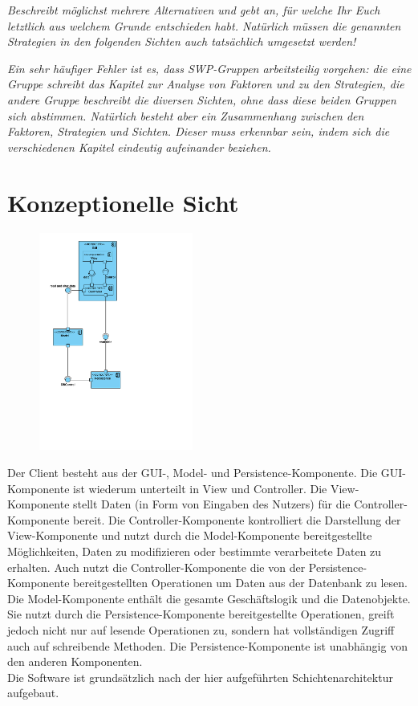 \documentclass[fontsize=12pt,paper=a4,twoside]{scrartcl}
\begin{document}
\textit{Beschreibt möglichst mehrere Alternativen und gebt
  an, für welche Ihr Euch letztlich aus welchem Grunde entschieden
  habt. Natürlich müssen die genannten Strategien in den folgenden
  Sichten auch tatsächlich umgesetzt werden!}

\textit{Ein sehr häufiger Fehler ist es, dass SWP-Gruppen
  arbeitsteilig vorgehen: die eine Gruppe schreibt das Kapitel zur
  Analyse von Faktoren und zu den Strategien, die andere Gruppe
  beschreibt die diversen Sichten, ohne dass diese beiden Gruppen sich
  abstimmen. Natürlich besteht aber ein Zusammenhang zwischen den
  Faktoren, Strategien und Sichten. Dieser muss erkennbar sein, indem
  sich die verschiedenen Kapitel eindeutig aufeinander beziehen.}

\section{Konzeptionelle Sicht}
\label{sec:konzeptionell}

\begin{figure}[H]
\centering
\includegraphics[width=0.45\textwidth]{konzeptsicht.pdf}
\end{figure}


Der Client besteht aus der GUI-, Model- und Persistence-Komponente. Die GUI-Komponente ist wiederum unterteilt in View und Controller. Die View-Komponente stellt Daten (in Form von Eingaben des Nutzers) für die Controller-Komponente bereit. Die Controller-Komponente kontrolliert die Darstellung der View-Komponente und nutzt durch die Model-Komponente bereitgestellte Möglichkeiten, Daten zu modifizieren oder bestimmte verarbeitete Daten zu erhalten. Auch nutzt die Controller-Komponente die von der Persistence-Komponente bereitgestellten Operationen um Daten aus der Datenbank zu lesen. Die Model-Komponente enthält die gesamte Geschäftslogik und die Datenobjekte. Sie nutzt durch die Persistence-Komponente bereitgestellte Operationen, greift jedoch nicht nur auf lesende Operationen zu, sondern hat vollständigen Zugriff auch auf schreibende Methoden. Die Persistence-Komponente ist unabhängig von den anderen Komponenten.\\
Die Software ist grundsätzlich nach der hier aufgeführten Schichtenarchitektur aufgebaut.
\end{document}
